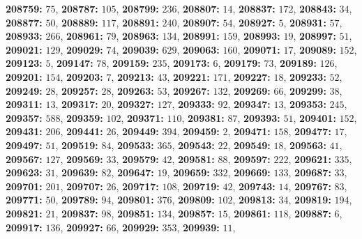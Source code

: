 \textsf{\bfseries 208759:} $75$, \textsf{\bfseries 208787:} $105$, \textsf{\bfseries 208799:} $236$, \textsf{\bfseries 208807:} $14$, \textsf{\bfseries 208837:} $172$, \textsf{\bfseries 208843:} $34$, \textsf{\bfseries 208877:} $50$, \textsf{\bfseries 208889:} $117$, \textsf{\bfseries 208891:} $240$, \textsf{\bfseries 208907:} $54$, \textsf{\bfseries 208927:} $5$, \textsf{\bfseries 208931:} $57$, \textsf{\bfseries 208933:} $266$, \textsf{\bfseries 208961:} $79$, \textsf{\bfseries 208963:} $134$, \textsf{\bfseries 208991:} $159$, \textsf{\bfseries 208993:} $19$, \textsf{\bfseries 208997:} $51$, \textsf{\bfseries 209021:} $129$, \textsf{\bfseries 209029:} $74$, \textsf{\bfseries 209039:} $629$, \textsf{\bfseries 209063:} $160$, \textsf{\bfseries 209071:} $17$, \textsf{\bfseries 209089:} $152$, \textsf{\bfseries 209123:} $5$, \textsf{\bfseries 209147:} $78$, \textsf{\bfseries 209159:} $235$, \textsf{\bfseries 209173:} $6$, \textsf{\bfseries 209179:} $73$, \textsf{\bfseries 209189:} $126$, \textsf{\bfseries 209201:} $154$, \textsf{\bfseries 209203:} $7$, \textsf{\bfseries 209213:} $43$, \textsf{\bfseries 209221:} $171$, \textsf{\bfseries 209227:} $18$, \textsf{\bfseries 209233:} $52$, \textsf{\bfseries 209249:} $28$, \textsf{\bfseries 209257:} $28$, \textsf{\bfseries 209263:} $53$, \textsf{\bfseries 209267:} $132$, \textsf{\bfseries 209269:} $66$, \textsf{\bfseries 209299:} $38$, \textsf{\bfseries 209311:} $13$, \textsf{\bfseries 209317:} $20$, \textsf{\bfseries 209327:} $127$, \textsf{\bfseries 209333:} $92$, \textsf{\bfseries 209347:} $13$, \textsf{\bfseries 209353:} $245$, \textsf{\bfseries 209357:} $588$, \textsf{\bfseries 209359:} $102$, \textsf{\bfseries 209371:} $110$, \textsf{\bfseries 209381:} $87$, \textsf{\bfseries 209393:} $51$, \textsf{\bfseries 209401:} $152$, \textsf{\bfseries 209431:} $206$, \textsf{\bfseries 209441:} $26$, \textsf{\bfseries 209449:} $394$, \textsf{\bfseries 209459:} $2$, \textsf{\bfseries 209471:} $158$, \textsf{\bfseries 209477:} $17$, \textsf{\bfseries 209497:} $51$, \textsf{\bfseries 209519:} $84$, \textsf{\bfseries 209533:} $365$, \textsf{\bfseries 209543:} $22$, \textsf{\bfseries 209549:} $18$, \textsf{\bfseries 209563:} $41$, \textsf{\bfseries 209567:} $127$, \textsf{\bfseries 209569:} $33$, \textsf{\bfseries 209579:} $42$, \textsf{\bfseries 209581:} $88$, \textsf{\bfseries 209597:} $222$, \textsf{\bfseries 209621:} $335$, \textsf{\bfseries 209623:} $31$, \textsf{\bfseries 209639:} $82$, \textsf{\bfseries 209647:} $19$, \textsf{\bfseries 209659:} $332$, \textsf{\bfseries 209669:} $133$, \textsf{\bfseries 209687:} $33$, \textsf{\bfseries 209701:} $201$, \textsf{\bfseries 209707:} $26$, \textsf{\bfseries 209717:} $108$, \textsf{\bfseries 209719:} $42$, \textsf{\bfseries 209743:} $14$, \textsf{\bfseries 209767:} $83$, \textsf{\bfseries 209771:} $50$, \textsf{\bfseries 209789:} $94$, \textsf{\bfseries 209801:} $376$, \textsf{\bfseries 209809:} $102$, \textsf{\bfseries 209813:} $34$, \textsf{\bfseries 209819:} $194$, \textsf{\bfseries 209821:} $21$, \textsf{\bfseries 209837:} $98$, \textsf{\bfseries 209851:} $134$, \textsf{\bfseries 209857:} $15$, \textsf{\bfseries 209861:} $118$, \textsf{\bfseries 209887:} $6$, \textsf{\bfseries 209917:} $136$, \textsf{\bfseries 209927:} $66$, \textsf{\bfseries 209929:} $353$, \textsf{\bfseries 209939:} $11$, 
